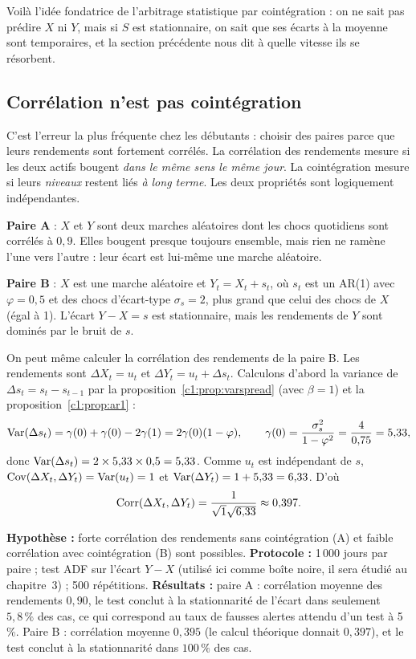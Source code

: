 Voilà l'idée fondatrice de l'arbitrage statistique par cointégration : on ne sait pas prédire $X$ ni $Y$, mais si $S$ est stationnaire, on sait que ses écarts à la moyenne sont temporaires, et la section précédente nous dit à quelle vitesse ils se résorbent.

\subsection{Corrélation n'est pas cointégration}

C'est l'erreur la plus fréquente chez les débutants : choisir des paires parce que leurs rendements sont fortement corrélés. La corrélation des rendements mesure si les deux actifs bougent \emph{dans le même sens le même jour}. La cointégration mesure si leurs \emph{niveaux} restent liés \emph{à long terme}. Les deux propriétés sont logiquement indépendantes.

\begin{example}
\textbf{Paire A} : $X$ et $Y$ sont deux marches aléatoires dont les chocs quotidiens sont corrélés à $0{,}9$. Elles bougent presque toujours ensemble, mais rien ne ramène l'une vers l'autre : leur écart est lui-même une marche aléatoire.

\textbf{Paire B} : $X$ est une marche aléatoire et $Y_t = X_t + s_t$, où $s_t$ est un AR(1) avec $\varphi = 0{,}5$ et des chocs d'écart-type $\sigma_s = 2$, plus grand que celui des chocs de $X$ (égal à 1). L'écart $Y - X = s$ est stationnaire, mais les rendements de $Y$ sont dominés par le bruit de $s$.
\end{example}

On peut même calculer la corrélation des rendements de la paire B. Les rendements sont $\Delta X_t = u_t$ et $\Delta Y_t = u_t + \Delta s_t$. Calculons d'abord la variance de $\Delta s_t = s_t - s_{t-1}$ par la proposition~\ref{c1:prop:varspread} (avec $\beta = 1$) et la proposition~\ref{c1:prop:ar1} :
\[
\operatorname{Var}(\Delta s_t) = \gamma(0) + \gamma(0) - 2\gamma(1) = 2\gamma(0)(1-\varphi), \qquad \gamma(0) = \frac{\sigma_s^2}{1-\varphi^2} = \frac{4}{0{,}75} = 5{,}33,
\]
donc $\operatorname{Var}(\Delta s_t) = 2\times 5{,}33\times 0{,}5 = 5{,}33$. Comme $u_t$ est indépendant de $s$, $\operatorname{Cov}(\Delta X_t,\Delta Y_t) = \operatorname{Var}(u_t) = 1$ et $\operatorname{Var}(\Delta Y_t) = 1 + 5{,}33 = 6{,}33$. D'où
\[
\operatorname{Corr}(\Delta X_t,\Delta Y_t) = \frac{1}{\sqrt{1}\sqrt{6{,}33}} \approx 0{,}397.
\]

\begin{codebox}
\textbf{Hypothèse :} forte corrélation des rendements sans cointégration (A) et faible corrélation avec cointégration (B) sont possibles. \textbf{Protocole :} 1\,000 jours par paire ; test ADF sur l'écart $Y-X$ (utilisé ici comme boîte noire, il sera étudié au chapitre~3) ; 500 répétitions. \textbf{Résultats :} paire A : corrélation moyenne des rendements $0{,}90$, le test conclut à la stationnarité de l'écart dans seulement $5{,}8\,\%$ des cas, ce qui correspond au taux de fausses alertes attendu d'un test à 5\,\%. Paire B : corrélation moyenne $0{,}395$ (le calcul théorique donnait $0{,}397$), et le test conclut à la stationnarité dans $100\,\%$ des cas.
\end{codebox}

